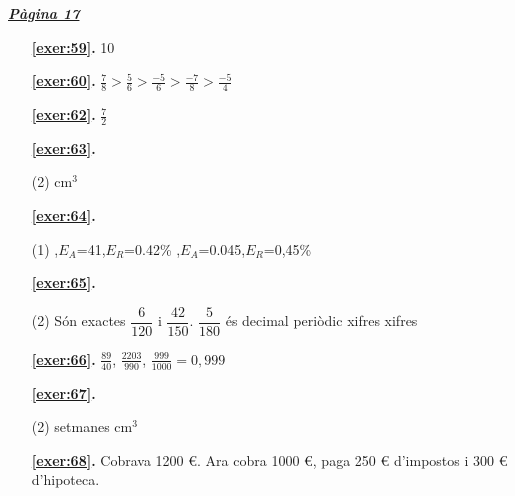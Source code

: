 \hyperlink{page.17}{\textbf{\em Pàgina 17}}
\begin{enumerate}
\item[\fontfamily{phv}\selectfont\color{blue}\textbf{\ref{exer:59}. }] \label{ans:59} 
10
 \end{enumerate}
\begin{enumerate}
\item[\fontfamily{phv}\selectfont\color{blue}\textbf{\ref{exer:60}. }] \label{ans:60} 
$\frac {7}{8}>\frac {5}{6}>\frac {-5}{6}>\frac {-7}{8}>\frac {-5}{4}$
\item[\fontfamily{phv}\selectfont\color{blue}\textbf{\ref{exer:62}. }] \label{ans:62} 
$\frac {7}{2}$



 \item[\fontfamily{phv}\selectfont\color{blue}\textbf{\ref{exer:63}. }] \label{ans:63}
 \begin{tasks}[column-sep=1em, item-indent=1.3333em](2)
	  cm${}^3$
\end{tasks}



 \item[\fontfamily{phv}\selectfont\color{blue}\textbf{\ref{exer:64}. }] \label{ans:64}
 \begin{tasks}[column-sep=1em, item-indent=1.3333em](1)
	 ,$E_A$=41,$E_R$=0.42\%
	 ,$E_A$=0.045,$E_R$=0,45\% 
\end{tasks}



 \item[\fontfamily{phv}\selectfont\color{blue}\textbf{\ref{exer:65}. }] \label{ans:65}
 \begin{tasks}[column-sep=1em, item-indent=1.3333em](2)
	 \task* Són exactes $\dfrac {6}{120}$ i $\dfrac {42}{150}$. $\dfrac {5}{180}$ és decimal periòdic
	  xifres
	  xifres
\end{tasks}
\item[\fontfamily{phv}\selectfont\color{blue}\textbf{\ref{exer:66}. }] \label{ans:66} 
$\frac {89}{40}$, $\frac {2203}{990}$, $\frac {999}{1000}=0,999$



 \item[\fontfamily{phv}\selectfont\color{blue}\textbf{\ref{exer:67}. }] \label{ans:67}
 \begin{tasks}[column-sep=1em, item-indent=1.3333em](2)
	  setmanes
	  cm${}^{3}$
\end{tasks}
\item[\fontfamily{phv}\selectfont\color{blue}\textbf{\ref{exer:68}. }] \label{ans:68} 
Cobrava 1200 \euro {}. Ara cobra 1000 \euro {}, paga 250 \euro {} d'impostos i 300 \euro {} d'hipoteca. 
 \end{enumerate}

